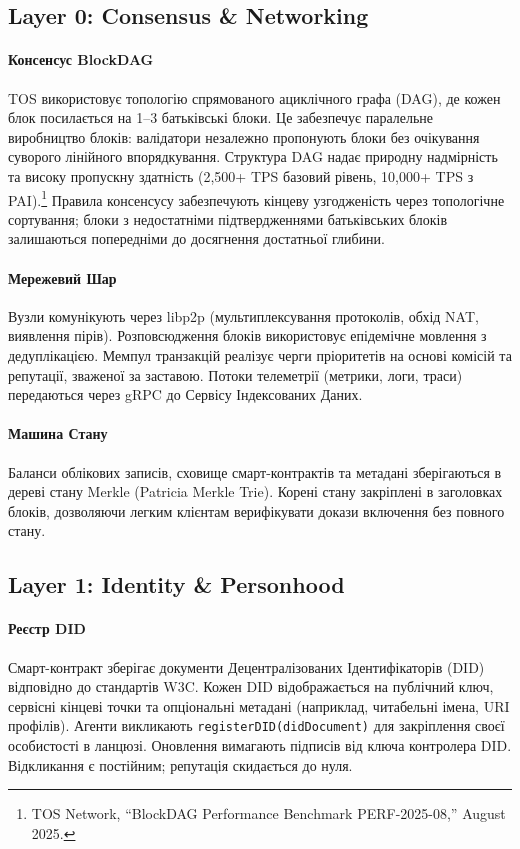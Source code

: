 \documentclass[11pt]{article}
\begin{document}
\subsection{Layer 0: Consensus \& Networking}
\paragraph{Консенсус BlockDAG} TOS використовує топологію спрямованого ациклічного графа (DAG), де кожен блок посилається на 1--3 батьківські блоки. Це забезпечує паралельне виробництво блоків: валідатори незалежно пропонують блоки без очікування суворого лінійного впорядкування. Структура DAG надає природну надмірність та високу пропускну здатність (2,500+ TPS базовий рівень, 10,000+ TPS з PAI).\footnote{TOS Network, ``BlockDAG Performance Benchmark PERF-2025-08,'' August 2025.} Правила консенсусу забезпечують кінцеву узгодженість через топологічне сортування; блоки з недостатніми підтвердженнями батьківських блоків залишаються попередніми до досягнення достатньої глибини.

\paragraph{Мережевий Шар} Вузли комунікують через libp2p (мультиплексування протоколів, обхід NAT, виявлення пірів). Розповсюдження блоків використовує епідемічне мовлення з дедуплікацією. Мемпул транзакцій реалізує черги пріоритетів на основі комісій та репутації, зваженої за заставою. Потоки телеметрії (метрики, логи, траси) передаються через gRPC до Сервісу Індексованих Даних.

\paragraph{Машина Стану} Баланси облікових записів, сховище смарт-контрактів та метадані зберігаються в дереві стану Merkle (Patricia Merkle Trie). Корені стану закріплені в заголовках блоків, дозволяючи легким клієнтам верифікувати докази включення без повного стану.

\subsection{Layer 1: Identity \& Personhood}
\paragraph{Реєстр DID} Смарт-контракт зберігає документи Децентралізованих Ідентифікаторів (DID) відповідно до стандартів W3C. Кожен DID відображається на публічний ключ, сервісні кінцеві точки та опціональні метадані (наприклад, читабельні імена, URI профілів). Агенти викликають \texttt{registerDID(didDocument)} для закріплення своєї особистості в ланцюзі. Оновлення вимагають підписів від ключа контролера DID. Відкликання є постійним; репутація скидається до нуля.
\end{document}
